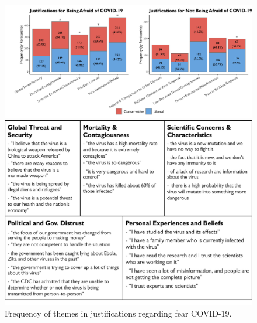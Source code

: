 \documentclass{article}
\begin{document}
\begin{figure}[!htbp]
  \captionsetup{justification=raggedright,singlelinecheck=false}
  \caption{Frequency of themes in justifications regarding fear COVID-19.}
  \label{fig:partisan7}
  \centering
  \includegraphics[width=\textwidth]{./figures/media/image13.png}

  \vspace{1cm}

  \label{tab:afraid}
  \centering
  \includegraphics[width=\textwidth]{./figures/media/Table5.png}
\end{figure}
\end{document}
